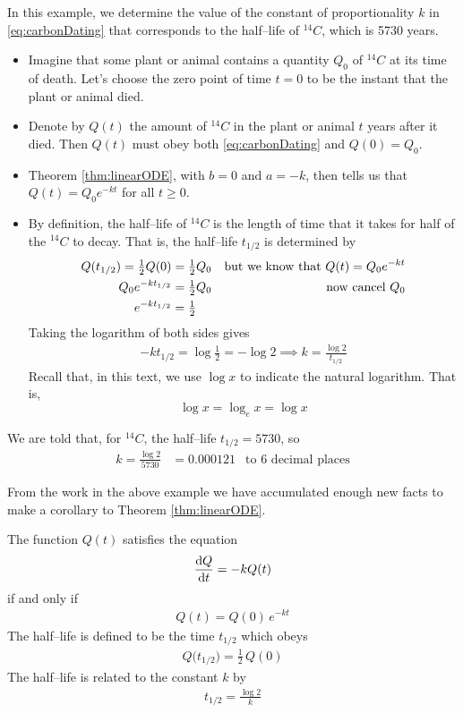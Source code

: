 \begin{eg}\label{eg:carbonDatingHalfLife}
In this example, we determine the value of the constant of proportionality
$k$ in \eqref{eq:carbonDating} that corresponds to the half--life
of ${}^{14}C$, which is 5730 years.
\begin{itemize}
\item Imagine that some plant or animal
contains a quantity $Q_0$ of ${}^{14}C$ at its time of death. Let's
choose the zero point of time $t=0$ to be the instant that the plant or
animal died.
\item
Denote by $Q(t)$ the amount of ${}^{14}C$ in the plant
or animal $t$ years after it died. Then $Q(t)$ must obey both
\eqref{eq:carbonDating} and $Q(0)=Q_0$.
\item
Theorem \ref{thm:linearODE}, with $b=0$ and $a=-k$, then tells us that
$Q(t) = Q_0 e^{-kt}$ for all $t\ge 0$.
\item
By definition, the half--life of ${}^{14}C$ is the length of time that it
takes for half of the ${}^{14}C$ to decay. That is, the half--life
$t_{1/2}$ is determined by
\begin{align*}
Q(t_{1/2})=\tfrac{1}{2} Q(0)&=\tfrac{1}{2} Q_0 &\text{but we know that $Q(t)=Q_0e^{-kt}$} \\
Q_0 e^{-kt_{1/2}}&=\tfrac{1}{2} Q_0&\text{now cancel $Q_0$} \\
e^{-kt_{1/2}}&=\tfrac{1}{2}
\end{align*}
Taking the logarithm of both sides gives
\begin{align*}
-k t_{1/2}=\log \frac{1}{2} = -\log 2
\implies k=\frac{\log 2}{t_{1/2}}
\end{align*}
Recall that, in this text, we use $\log x$ to indicate the natural
logarithm. That is,
\begin{equation*}
\log x = \log_e x=\log x
\end{equation*}
\end{itemize}
We are told that, for ${}^{14}C$, the half--life $t_{1/2}=5730$, so
\begin{align*}
k=\frac{\log 2}{5730} &= 0.000121 &\text{to $6$ decimal places}
\end{align*}
\end{eg}

From the work in the above example we have accumulated enough new facts to make
a corollary to Theorem \ref{thm:linearODE}.
\begin{cor}\label{cor:carbonDating}
The function $Q(t)$ satisfies the equation
\begin{align*}
\diff{Q}{t} = -k Q(t)
\end{align*}
if and only if
\begin{align*}
Q(t) = Q(0)\, e^{-kt}
\end{align*}
The half--life is defined to be the time $t_{1/2}$ which obeys
\begin{align*}
Q\big(t_{1/2}\big) = \frac{1}{2}\,Q(0)
\end{align*}
The half--life is related to the constant $k$ by
\begin{align*}
t_{1/2} =\frac{\log 2}{k}
\end{align*}
\end{cor}



